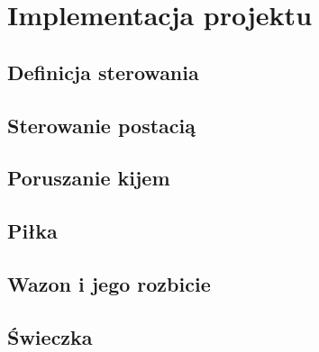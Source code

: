 \section{Implementacja projektu}

\subsection{Definicja sterowania}

\subsection{Sterowanie postacią}

\subsection{Poruszanie kijem}

\subsection{Piłka}

\subsection{Wazon i jego rozbicie}

\subsection{Świeczka}


